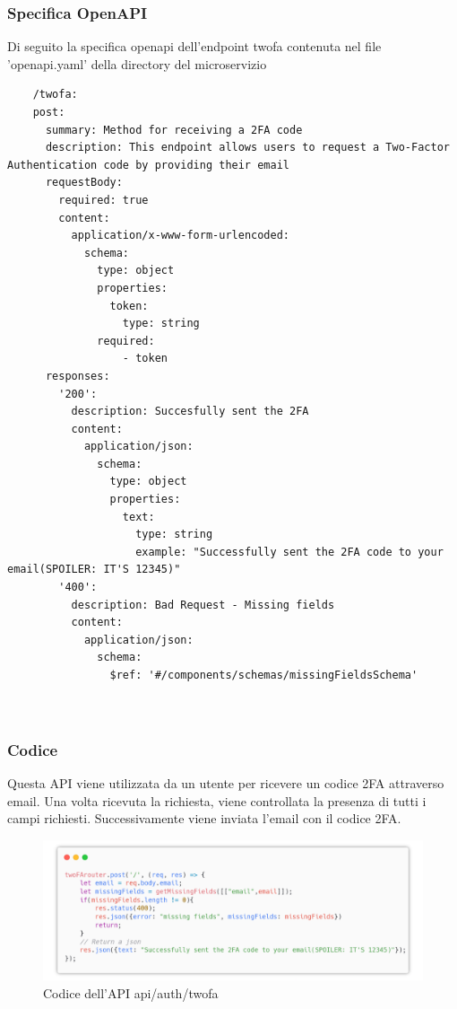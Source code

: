 \documentclass{report}
\begin{document}
\subsubsection*{Specifica OpenAPI}
Di seguito la specifica openapi dell'endpoint twofa contenuta nel file 'openapi.yaml' della directory del microservizio
\begin{verbatim}
	/twofa:
    post:
      summary: Method for receiving a 2FA code 
      description: This endpoint allows users to request a Two-Factor Authentication code by providing their email
      requestBody:
        required: true
        content:
          application/x-www-form-urlencoded:
            schema:
              type: object
              properties:
                token:
                  type: string
              required:
                  - token
      responses:
        '200':
          description: Succesfully sent the 2FA
          content:
            application/json:
              schema:
                type: object
                properties:
                  text:
                    type: string
                    example: "Successfully sent the 2FA code to your email(SPOILER: IT'S 12345)"
        '400':
          description: Bad Request - Missing fields 
          content:
            application/json:
              schema:
                $ref: '#/components/schemas/missingFieldsSchema'
                     
     
\end{verbatim}

\subsubsection*{Codice}
Questa API viene utilizzata da un utente per ricevere un codice 2FA attraverso email.
Una volta ricevuta la richiesta, viene controllata la presenza di tutti i campi richiesti.
Successivamente viene inviata l'email con il codice 2FA.

\begin{figure}[H]
	\centering\includegraphics[width=1\textwidth]{images/microservizio-autenticazione/twofa-carbon.png}
	Codice dell'API api/auth/twofa
\end{figure}
\end{document}
